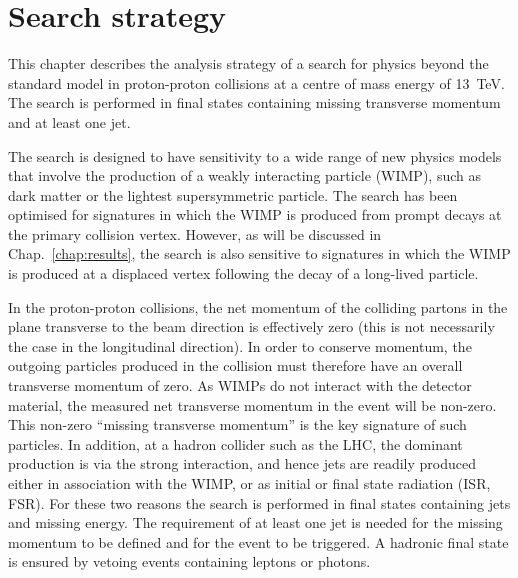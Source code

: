 \chapter{Search strategy}
\label{chap:analysis}

This chapter describes the analysis strategy of a search for physics 
beyond the standard model in proton-proton collisions at a centre of mass 
energy of 13~TeV. The search is performed in final states containing missing 
transverse momentum and at least one jet. 

The search is designed to have sensitivity to a wide range of new physics 
models that involve the production of a weakly interacting 
particle (WIMP), such as dark matter or the lightest supersymmetric particle. 
The search has been optimised for signatures in which the WIMP is produced from 
prompt decays at the primary collision vertex. However, as will be discussed in 
Chap.~\ref{chap:results}, the search is also sensitive to signatures in which 
the WIMP is produced at a displaced vertex following the decay of a long-lived 
particle. %

In the proton-proton collisions, the net momentum of the colliding partons in 
the plane transverse to the beam direction is effectively zero (this is not 
necessarily the case in the longitudinal direction). In order to conserve 
momentum, the 
outgoing particles produced in the collision must therefore have an overall 
transverse momentum of zero. As WIMPs do not interact with the detector 
material, the measured net transverse momentum in the event will be non-zero. 
This non-zero ``missing transverse momentum'' is the key signature of such 
particles. In addition, at a hadron collider such as the LHC, the dominant 
production is via the strong interaction, and hence jets are readily produced 
either in association with the WIMP, or as initial or final state radiation 
(ISR, FSR). For these two reasons the search is performed in final states 
containing jets and missing energy. The requirement of at least one jet is 
needed for the missing momentum to be defined and for the event to be 
triggered. A hadronic final state is ensured by vetoing events containing 
leptons or photons.

